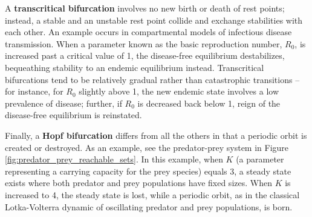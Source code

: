 A \textbf{transcritical bifurcation} involves no new birth or death of rest points; instead, a stable and an unstable rest point collide and exchange stabilities with each other. An example occurs in compartmental models of infectious disease transmission. When a parameter known as the basic reproduction number, $R_0$, is increased past a critical value of 1, the disease-free equilibrium destabilizes, bequeathing stability to an endemic equilibrium instead. Transcritical bifurcations tend to be relatively gradual rather than catastrophic transitions -- for instance, for $R_0$ slightly above 1, the new endemic state involves a low prevalence of disease; further, if $R_0$ is decreased back below 1, reign of the disease-free equilibrium is reinstated. 

Finally, a \textbf{Hopf bifurcation} differs from all the others in that a periodic orbit is created or destroyed. As an example, see the predator-prey system in Figure \ref{fig:predator_prey_reachable_sets}. In this example, when $K$ (a parameter representing a carrying capacity for the prey species) equals 3, a steady state exists where both predator and prey populations have fixed sizes. When $K$ is increased to 4, the steady state is lost, while a periodic orbit, as in the classical Lotka-Volterra dynamic of oscillating predator and prey populations, is born.

%	
%	
%	
%
%	



